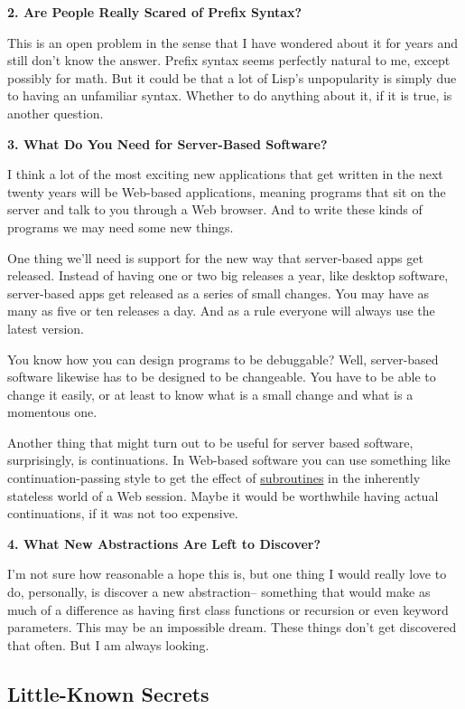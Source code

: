 \documentclass[12pt]{book}
\begin{document}
\textbf{2. Are People Really Scared of Prefix Syntax?}

This is an open problem in the sense that I have wondered about it for
years and still don't know the answer. Prefix syntax seems perfectly
natural to me, except possibly for math. But it could be that a lot of
Lisp's unpopularity is simply due to having an unfamiliar syntax.
Whether to do anything about it, if it is true, is another question.

\textbf{3. What Do You Need for Server-Based Software?}

I think a lot of the most exciting new applications that get written in
the next twenty years will be Web-based applications, meaning programs
that sit on the server and talk to you through a Web browser. And to
write these kinds of programs we may need some new things.

One thing we'll need is support for the new way that server-based apps
get released. Instead of having one or two big releases a year, like
desktop software, server-based apps get released as a series of small
changes. You may have as many as five or ten releases a day. And as a
rule everyone will always use the latest version.

You know how you can design programs to be debuggable? Well,
server-based software likewise has to be designed to be changeable. You
have to be able to change it easily, or at least to know what is a small
change and what is a momentous one.

Another thing that might turn out to be useful for server based
software, surprisingly, is continuations. In Web-based software you can
use something like continuation-passing style to get the effect of
\href{lwba.html}{subroutines} in the inherently stateless world of a Web
session. Maybe it would be worthwhile having actual continuations, if it
was not too expensive.

\textbf{4. What New Abstractions Are Left to Discover?}

I'm not sure how reasonable a hope this is, but one thing I would really
love to do, personally, is discover a new abstraction-- something that
would make as much of a difference as having first class functions or
recursion or even keyword parameters. This may be an impossible dream.
These things don't get discovered that often. But I am always looking.

\subsection{Little-Known Secrets}\label{little-known-secrets}
\end{document}

